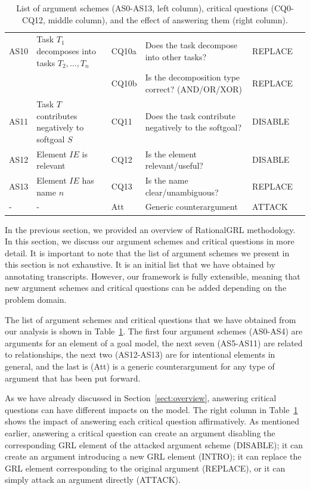 \begin{table}[h]
\begin{tabularx}{\textwidth}{|l|l|l|X|l|l|}
\hline
AS10 & Task $T_1$ decomposes into tasks $T_2,\ldots,T_n$ & CQ10a & Does the task decompose into other tasks?& REPLACE\\
 &  & CQ10b & Is the decomposition type correct? (AND/OR/XOR)& REPLACE\\
\hline
AS11 & Task $T$ contributes negatively to softgoal $S$& CQ11 & Does the task contribute negatively to the softgoal?& DISABLE\\
\hline
\hline
AS12 & Element $IE$ is relevant & CQ12 & Is the element relevant/useful? & DISABLE\\
\hline
AS13 & Element $IE$ has name $n$ & CQ13 & Is the name clear/unambiguous? & REPLACE\\
\hline
\hline
- & - & Att & Generic counterargument & ATTACK\\
\hline
\end{tabularx}
\caption{List of argument schemes (AS0-AS13, left column), critical questions (CQ0-CQ12, middle column), and the effect of answering them (right column).}
\label{table:argument-schemes}
\end{table}


In the previous section, we provided an overview of RationalGRL methodology. In this section, we discuss our argument schemes and critical questions in more detail. It is important to note that the list of argument schemes we present in this section is not exhaustive. It is an initial list that we have obtained by annotating transcripts. However, our framework is fully extensible, meaning that new argument schemes and critical questions can be added depending on the problem domain.

The list of argument schemes and critical questions that we have obtained from our analysis is shown in Table~\ref{table:argument-schemes}. The first four argument schemes (AS0-AS4) are arguments for an element of a goal model, the next seven (AS5-AS11) are related to relationships, the next two (AS12-AS13) are for intentional elements in general, and the last is (Att) is a generic counterargument for any type of argument that has been put forward.

As we have already discussed in Section~\ref{sect:overview}, answering critical questions can have different impacts on the model. The right column in Table~\ref{table:argument-schemes} shows the impact of answering each critical question affirmatively. %
As mentioned earlier, answering a critical question can create an argument disabling the corresponding GRL element of the attacked argument scheme (\textsf{DISABLE}); it can create an argument introducing a new GRL element (\textsf{INTRO}); it can replace the GRL element corresponding to the original argument (\textsf{REPLACE}), or it can simply attack an argument directly (\textsf{ATTACK}).

